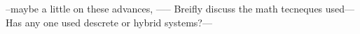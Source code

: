 --maybe
a little on these advances, ----- Breifly discuss the math
tecneques used---Has any one used descrete or hybrid systems?---